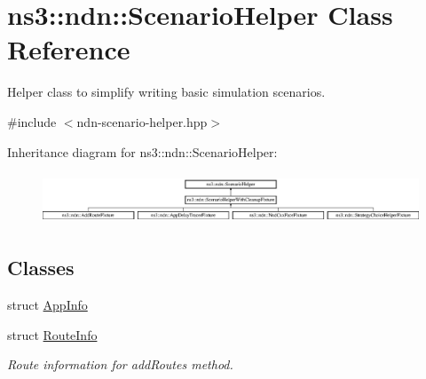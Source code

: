 \hypertarget{classns3_1_1ndn_1_1ScenarioHelper}{}\section{ns3\+:\+:ndn\+:\+:Scenario\+Helper Class Reference}
\label{classns3_1_1ndn_1_1ScenarioHelper}


Helper class to simplify writing basic simulation scenarios.  




{\ttfamily \#include $<$ndn-\/scenario-\/helper.\+hpp$>$}

Inheritance diagram for ns3\+:\+:ndn\+:\+:Scenario\+Helper\+:\begin{figure}[H]
\begin{center}
\leavevmode
\includegraphics[height=1.544118cm]{classns3_1_1ndn_1_1ScenarioHelper}
\end{center}
\end{figure}
\subsection*{Classes}
\begin{DoxyCompactItemize}
\item 
struct \hyperlink{structns3_1_1ndn_1_1ScenarioHelper_1_1AppInfo}{App\+Info}
\item 
struct \hyperlink{structns3_1_1ndn_1_1ScenarioHelper_1_1RouteInfo}{Route\+Info}
\begin{DoxyCompactList}\small\item\em Route information for add\+Routes method. \end{DoxyCompactList}\end{DoxyCompactItemize}
